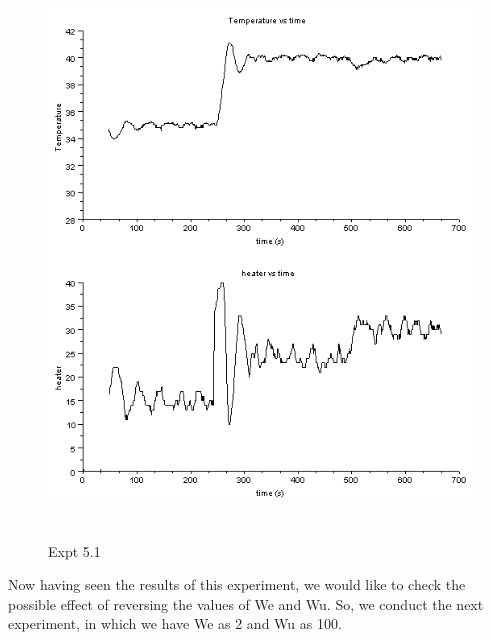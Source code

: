 \begin{figure}[H]
  \includegraphics[width=12cm, height=15cm]{mpc/5_1_heater_final.png}
  \caption{Expt 5.1}
\end{figure}
Now having seen the results of this experiment, we would like to check the possible effect of reversing the values of We and Wu. So, we conduct the next experiment, in which we have We as 2 and Wu as 100.


